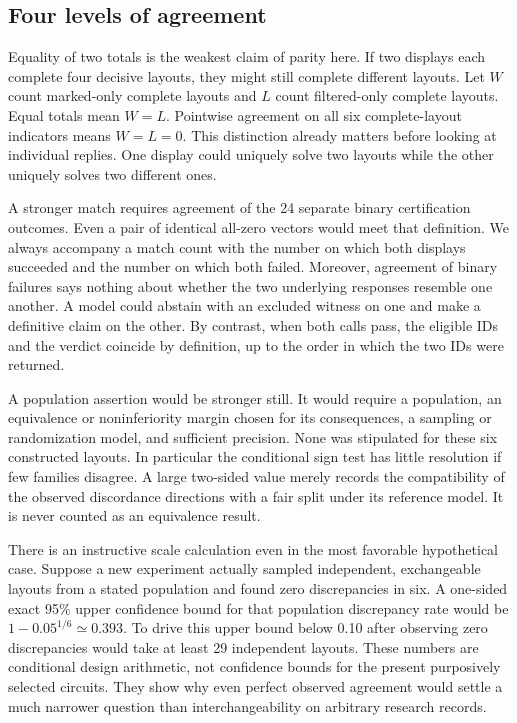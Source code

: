 \documentclass[12pt,letterpaper]{article}
\begin{document}
\subsection{Four levels of agreement}

Equality of two totals is the weakest claim of parity here. If two displays each complete four decisive layouts, they might still complete different layouts. Let $W$ count marked-only complete layouts and $L$ count filtered-only complete layouts. Equal totals mean $W=L$. Pointwise agreement on all six complete-layout indicators means $W=L=0$. This distinction already matters before looking at individual replies. One display could uniquely solve two layouts while the other uniquely solves two different ones.

A stronger match requires agreement of the 24 separate binary certification outcomes. Even a pair of identical all-zero vectors would meet that definition. We always accompany a match count with the number on which both displays succeeded and the number on which both failed. Moreover, agreement of binary failures says nothing about whether the two underlying responses resemble one another. A model could abstain with an excluded witness on one and make a definitive claim on the other. By contrast, when both calls pass, the eligible IDs and the verdict coincide by definition, up to the order in which the two IDs were returned.

A population assertion would be stronger still. It would require a population, an equivalence or noninferiority margin chosen for its consequences, a sampling or randomization model, and sufficient precision. None was stipulated for these six constructed layouts. In particular the conditional sign test has little resolution if few families disagree. A large two-sided value merely records the compatibility of the observed discordance directions with a fair split under its reference model. It is never counted as an equivalence result.

There is an instructive scale calculation even in the most favorable hypothetical case. Suppose a new experiment actually sampled independent, exchangeable layouts from a stated population and found zero discrepancies in six. A one-sided exact 95\% upper confidence bound for that population discrepancy rate would be $1-0.05^{1/6}\simeq0.393$. To drive this upper bound below 0.10 after observing zero discrepancies would take at least 29 independent layouts. These numbers are conditional design arithmetic, not confidence bounds for the present purposively selected circuits. They show why even perfect observed agreement would settle a much narrower question than interchangeability on arbitrary research records.
\end{document}
